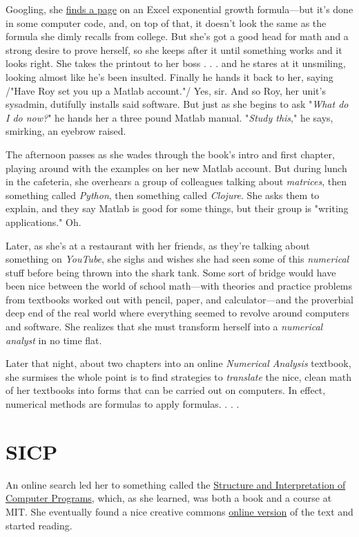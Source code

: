 \documentclass[koma]{article}
\begin{document}
Googling, she \href{http://www.excelfunctions.net/Excel-Growth-Function.html}{finds a page} on an Excel exponential growth formula---but it's done in some computer code, and, on top of that, it doesn't look the same as the formula she dimly recalls from college. But she's got a good head for math and a strong desire to prove herself, so she keeps after it until something works and it looks right. She takes the printout to her boss . . . and he stares at it unsmiling, looking almost like he's been insulted. Finally he hands it back to her, saying /"Have Roy set you up a Matlab account."/ Yes, sir. And so Roy, her unit's sysadmin, dutifully installs said software. But just as she begins to ask "\emph{What do I do now?}" he hands her a three pound Matlab manual. "\emph{Study this}," he says, smirking, an eyebrow raised.

The afternoon passes as she wades through the book's intro and first chapter, playing around with the examples on her new Matlab account. But during lunch in the cafeteria, she overhears a group of colleagues talking about \emph{matrices}, then something called \emph{Python}, then something called \emph{Clojure}. She asks them to explain, and they say Matlab is good for some things, but their group is "writing applications." Oh.

Later, as she's at a restaurant with her friends, as they're talking about something on \emph{YouTube}, she sighs and wishes she had seen some of this \emph{numerical} stuff before being thrown into the shark tank. Some sort of bridge would have been nice between the world of school math---with theories and practice problems from textbooks worked out with pencil, paper, and calculator---and the proverbial deep end of the real world where everything seemed to revolve around computers and software. She realizes that she must transform herself into a \emph{numerical analyst} in no time flat.

Later that night, about two chapters into an online \emph{Numerical Analysis} textbook, she surmises the whole point is to find strategies to \emph{translate} the nice, clean math of her textbooks into forms that can be carried out on computers. In effect, numerical methods are formulas to apply formulas. . . .

\section{SICP}
\label{sec:orgheadline4}

An online search led her to something called the \href{https://en.wikipedia.org/wiki/Structure_and_Interpretation_of_Computer_Programs}{Structure and Interpretation of Computer Programs}, which, as she learned, was both a book and a course at MIT. She eventually found a nice creative commons \href{http://sarabander.github.io/sicp/}{online version} of the text and started reading.
\end{document}
